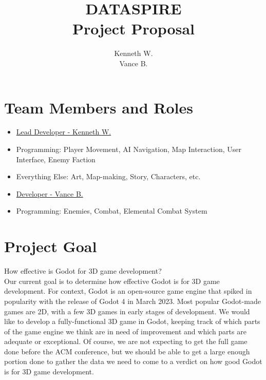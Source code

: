 \documentclass[legalpaper]{ltxdoc}
\begin{document}
	
	\title{\textsf{DATASPIRE\\Project Proposal}}
	\author{Kenneth W.\\Vance B.}
	\maketitle
	
	\section{Team Members and Roles}
	\begin{itemize}
		\item \underline{Lead Developer - Kenneth W.}
		\item[] Programming: Player Movement, AI Navigation, Map Interaction, User Interface, Enemy Faction
		\item[] Everything Else: Art, Map-making, Story, Characters, etc.\\
		
		\item \underline{Developer - Vance B.}
		\item[] Programming: Enemies, Combat, Elemental Combat System
	\end{itemize}
	
	\section{Project Goal}
	{\LARGE How effective is Godot for 3D game development?}\\
	
	\noindent Our current goal is to determine how effective Godot is for 3D game development. For context, Godot is an open-source game engine that spiked in popularity with the release of Godot 4 in March 2023. Most popular Godot-made games are 2D, with a few 3D games in early stages of development. We would like to develop a fully-functional 3D game in Godot, keeping track of which parts of the game engine we think are in need of improvement and which parts are adequate or exceptional. Of course, we are not expecting to get the full game done before the ACM conference, but we should be able to get a large enough portion done to gather the data we need to come to a verdict on how good Godot is for 3D game development.\\
	
\end{document}
